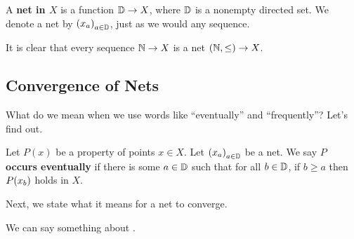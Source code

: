 \begin{boxdefinition}[Net]\label{Ch2:Def:Net}
    A \textbf{net in $X$} is a function $\mathbb{D} \to X$, where $\mathbb{D}$ is a nonempty directed set. We denote a net by $\left( x_a \right)_{a \in \mathbb{D}}$, just as we would any sequence.
\end{boxdefinition}

It is clear that every sequence $\mathbb{N} \to X$ is a net $\left( \mathbb{N}, \leq \right) \to X$.

\subsection{Convergence of Nets}

What do we mean when we use words like ``eventually'' and ``frequently''? Let's find out.

\begin{boxdefinition}
    Let $P(x)$ be a property of points $x \in X$. Let $\left( x_a \right)_{a \in \mathbb{D}}$ be a net. We say \textbf{$P$ occurs eventually} if there is some $a \in \mathbb{D}$ such that for all $b \in \mathbb{D}$, if $b \geq a$ then $P\!\left( x_b \right)$ holds in $X$.
\end{boxdefinition}

\begin{boxdefinition}
    \sorry
\end{boxdefinition}

Next, we state what it means for a net to converge.

\begin{boxdefinition}[Convergence]
    \sorry
\end{boxdefinition}

We can say something about \sorry.

